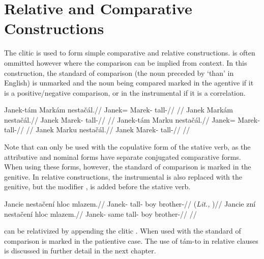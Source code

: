 \section{Relative and Comparative Constructions}\label{relativecomparative}

The clitic  is used to form simple comparative and relative constructions.  is often ommitted however where the comparison can be implied from context. In this construction, the standard of comparison (the noun preceded by `than' in English) is unmarked and the noun being compared marked in the agentive if it is a positive/negative comparison, or in the instrumental if it is a correlation.


\pex
\a
\begingl
\gla Janek-t\'am Mark\'am nesta\v{c}\'al.//
\glb Janek= Marek- tall-//
\glft {}//
\endgl
\a
\begingl
\gla Janek Mark\'am nesta\v{c}\'al.//
\glb Janek Marek- tall-//
\glft {}//
\endgl
\xe
\pex
\a
\begingl
\gla Janek-t\'am Marku nesta\v{c}\'al.//
\glb Janek= Marek- tall-//
\glft {}//
\endgl
\a
\begingl
\gla Janek Marku nesta\v{c}\'al.//
\glb Janek Marek- tall-//
\glft {}//
\endgl
\xe

Note that  can only be used with the copulative form of the stative verb, as the attributive and nominal forms have separate conjugated comparative forms. When using these forms, however, the standard of comparison is marked in the genitive. In relative constructions, the instrumental is also replaced with the genitive, but the modifier ,  is added before the stative verb.

\pex
\a
\begingl
\gla Jancie nesta\v{c}en\'i hloc mlazem.//
\glb Janek- tall- boy brother-//
\glft {} (\emph{Lit.,} )//
\endgl
\a
\begingl
\gla Jancie zn\'i nesta\v{c}en\'i hloc mlazem.//
\glb Janek- same tall- boy brother-//
\glft {}//
\endgl
\xe

 can be relativized by appending the clitic . When used with  the standard of comparison is marked in the patientive case. The use of t\'am-to in relative clauses is discussed in further detail in the next chapter.

